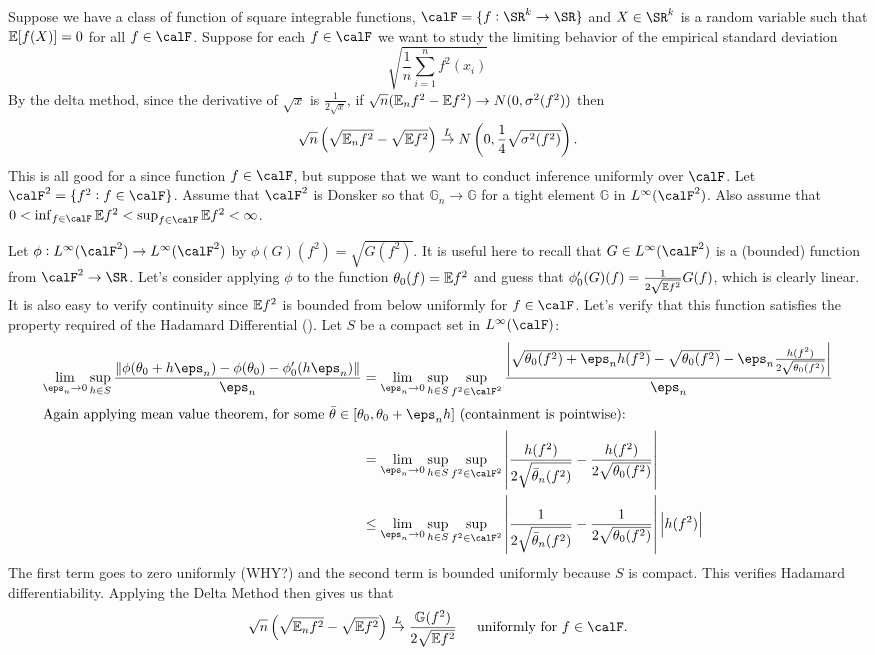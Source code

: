 \begin{example}
	\label{ex:uniform-variance-delta-method}
	Suppose we have a class of function of square integrable functions, \(\calF=\{f:\SR^k\to \SR\}\) and \(X\in \SR^k\) is a random variable such that \(\mathbb{E}[f(X)]=0\) for all \(f\in\calF\). Suppose for each \(f\in\calF\) we want to study the limiting behavior of the empirical standard deviation \[\sqrt{\frac{1}{n}\sum_{i=1}^n f^2(x_i)}\]
	By the delta method, since the derivative of \(\sqrt{x}\) is \(\frac{1}{2\sqrt{x}}\), if \(\sqrt{n}(\mathbb{E}_n f^2 -\mathbb{E} f^2)\to N(0,\sigma^2(f^2))\) then
	\[
		\sqrt{n}\left(\sqrt{\mathbb{E}_n f^2}-\sqrt{\mathbb{E} f^2}\right)\overset{L}{\to} N\left(0, \frac{1}{4}\sqrt{\sigma^2(f^2)}\right)	
	.\] 
	This is all good for a since function \(f\in \calF\), but suppose that we want to conduct inference uniformly over \(\calF\).  Let \(\calF^2 = \{f^2 : f\in\calF\}\). Assume that \(\calF^2\) is Donsker so that  \(\mathbb{G}_n\to\mathbb{G}\) for a tight element \(\mathbb{G}\) in \(L^\infty(\calF^2)\).  Also assume that \(0 < \inf_{f\in\calF}\E f^2<\sup_{f\in\calF}\E f^2<\infty\). 

	Let \(\phi:L^\infty(\calF^2)\to L^\infty(\calF^2)\) by \(\phi(G)(f^2) = \sqrt{G(f^2)}\). It is useful here to recall that \(G \in L^\infty(\calF^2)\) is a (bounded) function from  \(\calF^2\to\SR\). Let's consider applying \(\phi\) to the function  \(\theta_0(f)=\mathbb{E} f^2\) and guess that \(\phi_0'(G)(f) = \frac{1}{2\sqrt{\mathbb{E} f^2}}G(f)\), which is clearly linear. It is also easy to verify continuity since \(\mathbb{E} f^2\) is bounded from below uniformly for \(f\in\calF\). Let's verify that this function satisfies the property required of the Hadamard Differential (). Let \(S\) be a compact set in  \(L^\infty(\calF)\):
	\begin{align*}
		\lim_{\eps_n\to 0}\sup_{h \in S}\frac{\|\phi(\theta_0+h\eps_n)-\phi(\theta_0)-\phi_0'(h\eps_n)\|}{\eps_n} 
		&= \lim_{\eps_n\to 0}\sup_{h\in S} \sup_{f^2\in\calF^2}\frac{ \left|\sqrt{\theta_0(f^2)+\eps_nh(f^2)}-\sqrt{\theta_0(f^2)} - \eps_n\frac{h(f^2)}{2\sqrt{\theta_0(f^2)}} \right|}{\eps_n} \\
		\intertext{Again applying mean value theorem, for some \(\bar\theta \in [\theta_0, \theta_0+\eps_n h]\) (containment is pointwise):} 
		&= \lim_{\eps_n\to0}\sup_{h\in S}\sup_{f^2 \in \calF^2} \left|\frac{h(f^2)}{2\sqrt{\bar\theta_n(f^2)}} - \frac{h(f^2)}{2\sqrt{\theta_0(f^2)}}  \right| \\
		&\leq \lim_{\eps_n\to 0}\sup_{h\in S}\sup_{f^2\in\calF^2}\left|\frac{1}{2\sqrt{\bar\theta_n(f^2)}}-\frac{1}{2\sqrt{\theta_0(f^2)}}\right|\left|h(f^2)\right|
	\end{align*}
	The first term goes to zero uniformly (WHY?) and the second term is bounded uniformly because \(S\) is compact. This verifies Hadamard differentiability. Applying the Delta Method then gives us that 
	\[
		\sqrt{n}\left(\sqrt{\E_n f^2}-\sqrt{\E f^2}\right)\overset{L}{\to} \frac{\mathbb{G}(f^2)}{2\sqrt{\E f^2}}\;\;\;\;\text{ uniformly for \(f\in\calF\)}
	.\]
\end{example}
